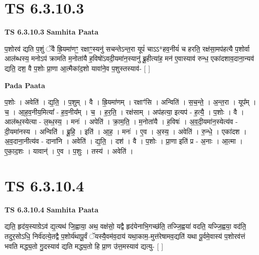 \documentclass[17pt]{extarticle}
\begin{document}
\section*{ TS 6.3.10.3 }

\textbf{TS 6.3.10.3 } \newline
\textbf{Samhita Paata} \newline

प॒शोरव॑ द्यति प॒शुं ॅवै ह्रि॒यमा॑णꣳ॒॒ रक्षाꣳ॒॒स्यनु॑ सचन्तेऽन्त॒रा यूपं॑ चाऽऽ*हव॒नीयं॑ च हरति॒ रक्ष॑सा॒मप॑हत्यै प॒शोर्वा आल॑ब्धस्य॒ मनोऽप॑ क्रामति म॒नोता॑यै ह॒विषो॑ऽवदी॒यमा॑न॒स्यानु॑ ब्रू॒हीत्या॑ह॒ मन॑ ए॒वास्याव॑ रुन्ध॒ एका॑दशाव॒दाना॒न्यव॑ द्यति॒ दश॒ वै प॒शोः प्रा॒णा आ॒त्मैका॑द॒शो यावा॑ने॒व प॒शुस्तस्याव॑- [  ] \newline

\textbf{Pada Paata} \newline

प॒शोः । अवेति॑ । द्य॒ति॒ । प॒शुम् । वै । ह्रि॒यमा॑णम् । रक्षाꣳ॑सि । अन्विति॑ । स॒च॒न्ते॒ । अ॒न्त॒रा । यूप᳚म् । च॒ । आ॒ह॒व॒नीय॒मित्या᳚ - ह॒व॒नीय᳚म् । च॒ । ह॒र॒ति॒ । रक्ष॑साम् । अप॑हत्या॒ इत्यप॑ - ह॒त्यै॒ । प॒शोः । वै । आल॑ब्ध॒स्येत्या - ल॒ब्ध॒स्य॒ । मनः॑ । अपेति॑ । क्रा॒म॒ति॒ । म॒नोता॑यै । ह॒विषः॑ । अ॒व॒दी॒यमा॑न॒स्येत्य॑व - दी॒यमा॑नस्य । अन्विति॑ । ब्रू॒हि॒ । इति॑ । आ॒ह॒ । मनः॑ । ए॒व । अ॒स्य॒ । अवेति॑ । रु॒न्धे॒ । एका॑दश । अ॒व॒दाना॒नीत्य॑व - दाना॑नि । अवेति॑ । द्य॒ति॒ । दश॑ । वै । प॒शोः । प्रा॒णा इति॑ प्र - अ॒नाः । आ॒त्मा । ए॒का॒द॒शः । यावान्॑ । ए॒व । प॒शुः । तस्य॑ । अवेति॑ ।  \newline




\section*{ TS 6.3.10.4 }

\textbf{TS 6.3.10.4 } \newline
\textbf{Samhita Paata} \newline

द्यति॒ हृद॑य॒स्याग्रेऽव॑ द्य॒त्यथ॑ जि॒ह्वाया॒ अथ॒ वक्ष॑सो॒ यद्वै हृद॑येनाभि॒गच्छ॑ति॒ तज्जि॒ह्वया॑ वदति॒ यज्जि॒ह्वया॒ वद॑ति॒ तदुर॒सोऽधि॒ निर्व॑दत्ये॒तद्वै प॒शोर्य॑थापू॒र्वं ॅयस्यै॒वम॑व॒दाय॑ यथा॒काम॒-मुत्त॑रेषामव॒द्यति॑ यथा पू॒र्वमे॒वास्य॑ प॒शोरव॑त्तं भवति मद्ध्य॒तो गु॒दस्याव॑ द्यति मद्ध्य॒तो हि प्रा॒ण उ॑त्त॒मस्याव॑ द्यत्यु- [  ] \newline
\end{document}
